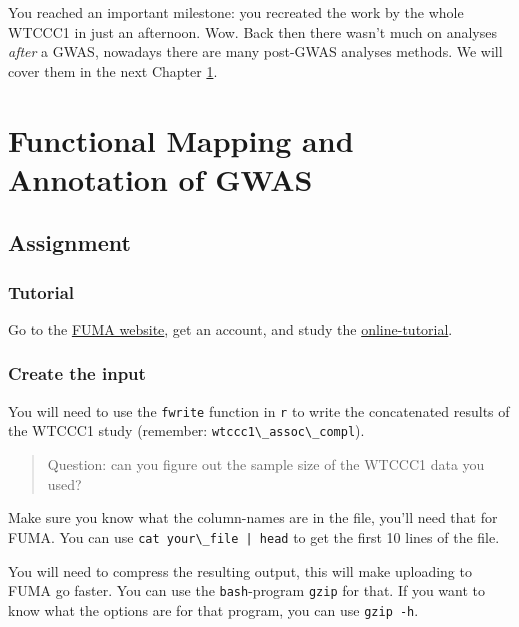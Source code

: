 \documentclass[
]{book}
\newcommand{\passthrough}[1]{#1}
\begin{document}
You reached an important milestone: you recreated the work by the whole WTCCC1 in just an afternoon. Wow. Back then there wasn't much on analyses \emph{after} a GWAS, nowadays there are many post-GWAS analyses methods. We will cover them in the next Chapter \ref{fuma}.

\hypertarget{fuma}{%
\chapter{Functional Mapping and Annotation of GWAS}\label{fuma}}

\hypertarget{assignment-1}{%
\section{Assignment}\label{assignment-1}}

\hypertarget{tutorial}{%
\subsection{Tutorial}\label{tutorial}}

Go to the \href{https://fuma.ctglab.nl}{FUMA website}, get an account, and study the \href{https://fuma.ctglab.nl/tutorial}{online-tutorial}.

\hypertarget{create-the-input}{%
\subsection{Create the input}\label{create-the-input}}

You will need to use the \passthrough{\lstinline!fwrite!} function in \passthrough{\lstinline!r!} to write the concatenated results of the WTCCC1 study (remember: \passthrough{\lstinline!wtccc1\_assoc\_compl!}).

\begin{quote}
Question: can you figure out the sample size of the WTCCC1 data you used?
\end{quote}

Make sure you know what the column-names are in the file, you'll need that for FUMA. You can use \passthrough{\lstinline!cat your\_file | head!} to get the first 10 lines of the file.

You will need to compress the resulting output, this will make uploading to FUMA go faster. You can use the \passthrough{\lstinline!bash!}-program \passthrough{\lstinline!gzip!} for that. If you want to know what the options are for that program, you can use \passthrough{\lstinline!gzip -h!}.
\end{document}

